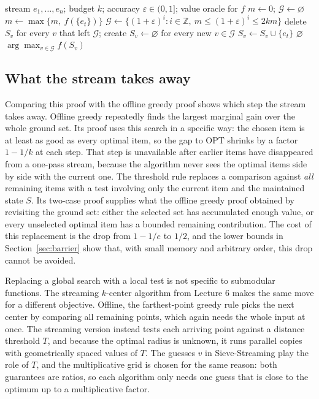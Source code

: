 \documentclass[10pt]{article}
\newcommand{\OPT}{\mathrm{OPT}}
\newcommand{\marg}[2]{\Delta_f(#1\mid #2)}
\begin{document}
\begin{algorithm}[ht]
\caption{Sieve-Streaming (one pass, lazy guesses)}
\label{alg:sieve}
\begin{algorithmic}[1]
\Require stream $e_1,\ldots,e_n$; budget $k$; accuracy $\varepsilon\in(0,1]$; value oracle for $f$
\State $m\gets 0$; \quad $\mathcal{G}\gets\varnothing$ 
    \State $m\gets\max\{m,\ f(\{e_t\})\}$
    \State $\mathcal{G}\gets\{(1+\varepsilon)^i : i\in\mathbb{Z},\ m\leq(1+\varepsilon)^i\leq 2km\}$
    \State delete $S_v$ for every $v$ that left $\mathcal{G}$; create $S_v\gets\varnothing$ for every new $v\in\mathcal{G}$
        \If{$|S_v|<k$ \textbf{and} $\marg{e_t}{S_v}\geq \dfrac{v/2-f(S_v)}{k-|S_v|}$}
            \State $S_v\gets S_v\cup\{e_t\}$
        \EndIf
    \EndFor
\EndFor
{}
    \State \Return $\varnothing$
\EndIf
\State \Return $\arg\max_{v\in\mathcal{G}} f(S_v)$
\end{algorithmic}
\end{algorithm}

\subsection{What the stream takes away}
Comparing this proof with the offline greedy proof shows which step the stream takes away. Offline greedy repeatedly finds the largest marginal gain over the whole ground set. Its proof uses this search in a specific way: the chosen item is at least as good as every optimal item, so the gap to $\OPT$ shrinks by a factor $1-1/k$ at each step. That step is unavailable after earlier items have disappeared from a one-pass stream, because the algorithm never sees the optimal items side by side with the current one. The threshold rule replaces a comparison against \emph{all} remaining items with a test involving only the current item and the maintained state $S$. Its two-case proof supplies what the offline greedy proof obtained by revisiting the ground set: either the selected set has accumulated enough value, or every unselected optimal item has a bounded remaining contribution. The cost of this replacement is the drop from $1-1/e$ to $1/2$, and the lower bounds in Section~\ref{sec:barrier} show that, with small memory and arbitrary order, this drop cannot be avoided.

Replacing a global search with a local test is not specific to submodular functions. The streaming $k$-center algorithm from Lecture 6 makes the same move for a different objective. Offline, the farthest-point greedy rule picks the next center by comparing all remaining points, which again needs the whole input at once. The streaming version instead tests each arriving point against a distance threshold $T$, and because the optimal radius is unknown, it runs parallel copies with geometrically spaced values of $T$. The guesses $v$ in Sieve-Streaming play the role of $T$, and the multiplicative grid is chosen for the same reason: both guarantees are ratios, so each algorithm only needs one guess that is close to the optimum up to a multiplicative factor.
\end{document}
